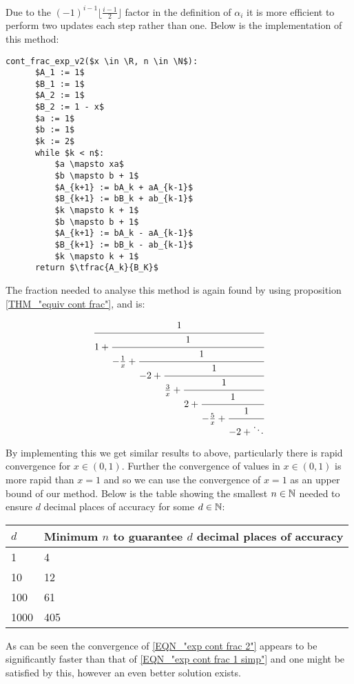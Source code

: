 Due to the \((-1)^{i-1}\lfloor\frac{i-1}{2}\rfloor\) factor in the definition of \(\alpha_i\) it is more efficient to perform two updates each step rather than one. Below is the implementation of this method:

\begin{lstlisting}[caption={Continued fraction for \(e^x\) version 2},label={PCD_"cont exp v2"}]
  cont_frac_exp_v2($x \in \R, n \in \N$):
      $A_1 := 1$
      $B_1 := 1$
      $A_2 := 1$
      $B_2 := 1 - x$
      $a := 1$
      $b := 1$
      $k := 2$
      while $k < n$:
          $a \mapsto xa$
          $b \mapsto b + 1$
          $A_{k+1} := bA_k + aA_{k-1}$
          $B_{k+1} := bB_k + ab_{k-1}$
          $k \mapsto k + 1$
          $b \mapsto b + 1$
          $A_{k+1} := bA_k - aA_{k-1}$
          $B_{k+1} := bB_k - ab_{k-1}$
          $k \mapsto k + 1$
      return $\tfrac{A_k}{B_K}$
\end{lstlisting}

The fraction needed to analyse this method is again found by using proposition \ref{THM_"equiv cont frac"}, and is:

\begin{displaymath}
	\cfrac{1}{1 +
	\cfrac{1}{-\frac{1}{x} +
	\cfrac{1}{-2 + 
	\cfrac{1}{\frac{3}{x} +
	\cfrac{1}{2 + 
	\cfrac{1}{-\frac{5}{x} +
	\cfrac{1}{-2 + \ddots} } } } } } }
\end{displaymath}

By implementing this we get similar results to above, particularly there is rapid convergence for \(x \in (0, 1)\). Further the convergence of values in \(x \in (0,1)\) is more rapid than \(x = 1\) and so we can use the convergence of \(x = 1\) as an upper bound of our method. Below is the table showing the smallest \(n \in \mathbb{N}\) needed to ensure \(d\) decimal places of accuracy for some \(d \in \mathbb{N}\):

\begin{center}
\begin{tabular}{|l|l|}
\hline
\(d\) & Minimum \(n\) to guarantee \(d\) decimal places of accuracy\\\hline
1 & 4 \\\hline
10 & 12 \\\hline
100 & 61 \\\hline
1000 & 405 \\\hline
\end{tabular}
\end{center}

As can be seen the convergence of \ref{EQN_"exp cont frac 2"} appears to be significantly faster than that of \ref{EQN_"exp cont frac 1 simp"} and one might be satisfied by this, however an even better solution exists.\\

